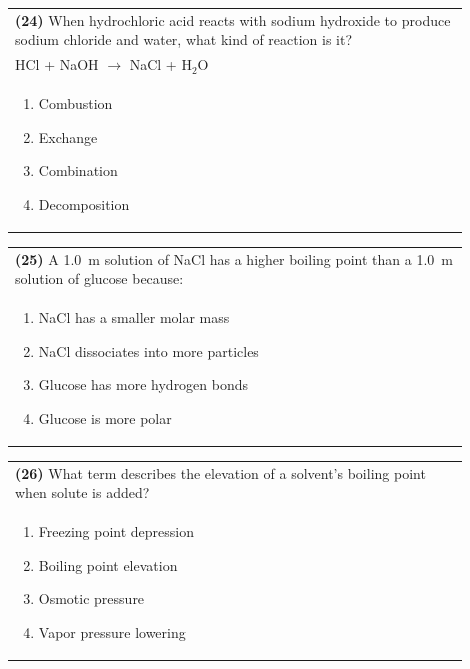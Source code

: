 \documentclass{article}
\begin{document}
\noindent\begin{tabular}{|p{0.9\linewidth}|}
\hline
\textbf{(24)} When hydrochloric acid reacts with sodium hydroxide to produce sodium chloride and water, what kind of reaction is it?\\[0.2cm]
HCl + NaOH $\rightarrow$  NaCl + H$_2$O\\[0.2cm]
\begin{minipage}[t]{0.85\linewidth}
\begin{enumerate}[label=\alph*.]
\item Combustion
\item Exchange
\item Combination
\item Decomposition
\end{enumerate}
\end{minipage}\\[0.2cm]
\hline
\end{tabular}
\newpage


\noindent\begin{tabular}{|p{0.9\linewidth}|}
\hline
\textbf{(25)} A 1.0~m solution of NaCl has a higher boiling point than a 1.0~m solution of glucose because:\\[0.2cm]
\begin{minipage}[t]{0.85\linewidth}
\begin{enumerate}[label=\alph*.]
\item NaCl has a smaller molar mass
\item NaCl dissociates into more particles
\item Glucose has more hydrogen bonds
\item Glucose is more polar
\end{enumerate}
\end{minipage}\\[0.2cm]
\hline
\end{tabular}

\noindent\begin{tabular}{|p{0.9\linewidth}|}
\hline
\textbf{(26)} What term describes the elevation of a solvent's boiling point when solute is added?\\[0.2cm]
\begin{minipage}[t]{0.85\linewidth}
\begin{enumerate}[label=\alph*.]
\item Freezing point depression
\item Boiling point elevation
\item Osmotic pressure
\item Vapor pressure lowering
\end{enumerate}
\end{minipage}\\[0.2cm]
\hline
\end{tabular}
\end{document}
